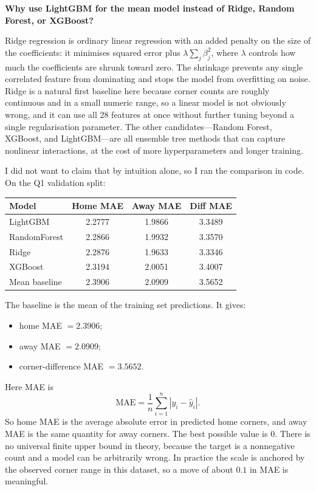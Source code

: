 \documentclass{article}
\begin{document}
\bigskip

\noindent \textbf{Why use LightGBM for the mean model instead of Ridge, Random Forest, or XGBoost?}

\noindent Ridge regression is ordinary linear regression with an added penalty on the size of the coefficients: it minimises squared error plus \(\lambda \sum_j \beta_j^2\), where \(\lambda\) controls how much the coefficients are shrunk toward zero.
The shrinkage prevents any single correlated feature from dominating and stops the model from overfitting on noise.
Ridge is a natural first baseline here because corner counts are roughly continuous and in a small numeric range, so a linear model is not obviously wrong, and it can use all 28 features at once without further tuning beyond a single regularisation parameter.
The other candidates---Random Forest, XGBoost, and LightGBM---are all ensemble tree methods that can capture nonlinear interactions, at the cost of more hyperparameters and longer training.

I did not want to claim that by intuition alone, so I ran the comparison in code. On the Q1 validation split:
\begin{center}
\begin{tabular}{lccc}
\toprule
Model & Home MAE & Away MAE & Diff MAE \\
\midrule
LightGBM & 2.2777 & 1.9866 & 3.3489 \\
RandomForest & 2.2866 & 1.9932 & 3.3570 \\
Ridge & 2.2876 & 1.9633 & 3.3346 \\
XGBoost & 2.3194 & 2.0051 & 3.4007 \\
Mean baseline & 2.3906 & 2.0909 & 3.5652 \\
\bottomrule
\end{tabular}
\end{center}

\noindent The baseline is the mean of the training set predictions. It gives:
\begin{itemize}
    \item home MAE \(= 2.3906\);
    \item away MAE \(= 2.0909\);
    \item corner-difference MAE \(= 3.5652\).
\end{itemize}

Here MAE is
\[
\text{MAE}=\frac{1}{n}\sum_{i=1}^{n}\left|y_i-\hat{y}_i\right|.
\]
So home MAE is the average absolute error in predicted home corners, and away MAE is the same quantity for away corners. The best possible value is \(0\). There is no universal finite upper bound in theory, because the target is a nonnegative count and a model can be arbitrarily wrong. In practice the scale is anchored by the observed corner range in this dataset, so a move of about \(0.1\) in MAE is meaningful.
\end{document}
